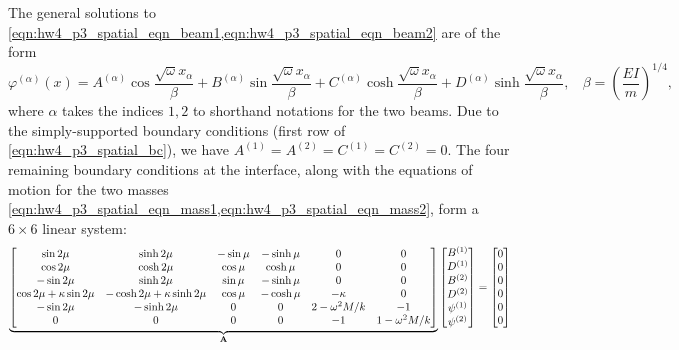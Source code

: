 The general solutions to \cref{eqn:hw4_p3_spatial_eqn_beam1,eqn:hw4_p3_spatial_eqn_beam2} are of the form
\begin{equation}
    \varphi^{(\alpha)}(x) = A^{(\alpha)} \cos \frac{\sqrt{\omega}x_\alpha}{\beta} + B^{(\alpha)} \sin \frac{\sqrt{\omega}x_\alpha}{\beta} + C^{(\alpha)} \cosh \frac{\sqrt{\omega}x_\alpha}{\beta} + D^{(\alpha)} \sinh \frac{\sqrt{\omega}x_\alpha}{\beta}, ~~~~ \beta = {\left(\frac{EI}{m}\right)}^{1/4},
\end{equation}
where $\alpha$ takes the indices $1, 2$ to shorthand notations for the two beams.
Due to the simply-supported boundary conditions (first row of \cref{eqn:hw4_p3_spatial_bc}), we have $A^{(1)} = A^{(2)} = C^{(1)} = C^{(2)} = 0$.
The four remaining boundary conditions at the interface, along with the equations of motion for the two masses \cref{eqn:hw4_p3_spatial_eqn_mass1,eqn:hw4_p3_spatial_eqn_mass2}, form a $6\times 6$ linear system:
\begin{equation}\label{eqn:hw4_p3_eigenvalue_problem}
    \underbrace{\begin{bmatrix}
        \sin 2\mu & \sinh 2\mu & -\sin \mu & -\sinh \mu & 0 & 0 \\
        \cos 2\mu & \cosh 2\mu & \cos \mu & \cosh \mu & 0 & 0 \\
        -\sin 2\mu & \sinh 2\mu & \sin \mu & -\sinh \mu & 0 & 0 \\
        \cos 2\mu+\kappa \sin 2\mu & - \cosh 2\mu + \kappa \sinh 2\mu & \cos \mu & -\cosh \mu & -\kappa & 0 \\
        -\sin 2\mu & -\sinh 2\mu & 0 & 0 & 2 - \omega^2 M/k & -1 \\
        0 & 0 & 0 & 0 & -1 & 1 - \omega^2 M/k
    \end{bmatrix}}_{\mathbf{A}}
    \begin{bmatrix}
        B^{(1)} \\ D^{(1)} \\ B^{(2)} \\ D^{(2)} \\ \psi^{(1)} \\ \psi^{(2)}
    \end{bmatrix} = 
    \begin{bmatrix}
        0 \\ 0 \\ 0 \\ 0 \\ 0 \\ 0
    \end{bmatrix}
\end{equation}
